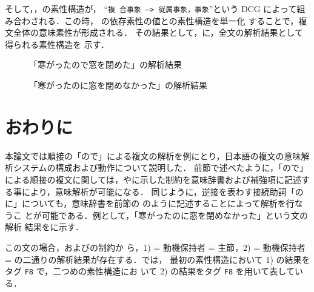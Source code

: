 そして，，の素性構造が， ``{\tt 複
合事象 --> 従属事象，事象}''という DCG によって組み合わされる．この時，
の依存素性の値との素性構造を単一化
することで，複文全体の意味素性が形成される．
その結果として，に，全文の解析結果として得られる素性構造を
示す．

\begin{figure}[htbp]

\begin{center}
  
\end{center}


\caption{「寒がったので窓を閉めた」の解析結果}
\vspace*{7cm}
\end{figure}

\begin{figure}[htbp]
\begin{center}
  
\end{center}


\caption{「寒がったのに窓を閉めなかった」の解析結果}
\end{figure}

\section{おわりに}

本論文では順接の「ので」による複文の解析を例にとり，日本語の複文の意味解
析システムの構成および動作について説明した．
前節で述べたように，「ので」による順接の複文に関しては，やに示した制約を意味辞書および補強項に記述す
る事により，意味解析が可能になる．
同じように，逆接を表わす接続助詞「のに」についても，意味辞書を前節の
のように記述することによって解析を行なうこ
とが可能である．例として，「寒がったのに窓を閉めなかった」という文の解析
結果をに示す．

この文の場合，およびの制約か
ら，1)  = 動機保持者 = 
{\small 主節}，2)  = 動機保持者 =  の二通りの解析結果が存在する．では，
最初の素性構造において 1) の結果をタグ {\tt F8} で，二つめの素性構造にお
いて 2) の結果をタグ {\tt F8} を用いて表している．

